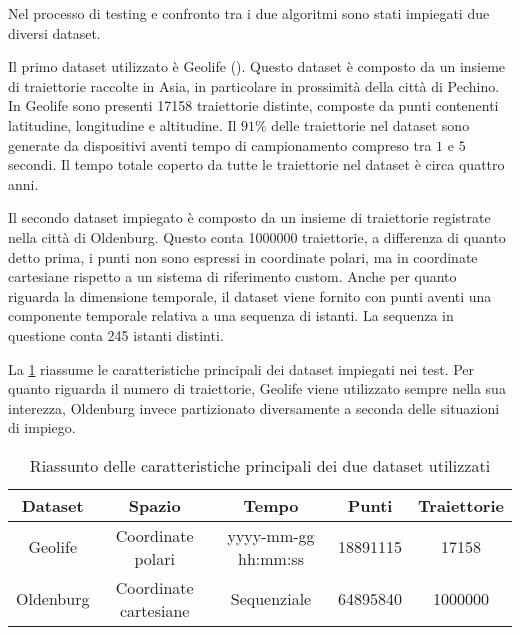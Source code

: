 Nel processo di testing e confronto tra i due algoritmi sono stati impiegati due diversi dataset.

Il primo dataset utilizzato è Geolife (\cite{GeolifeG31:online}).
Questo dataset è composto da un insieme di traiettorie raccolte in Asia, in particolare in prossimità della città di Pechino.
In Geolife sono presenti 17158 traiettorie distinte, composte da punti contenenti latitudine, longitudine e altitudine.
Il \(91\%\) delle traiettorie nel dataset sono generate da dispositivi aventi tempo di campionamento compreso tra \(1\) e \(5\) secondi.
Il tempo totale coperto da tutte le traiettorie nel dataset è circa quattro anni.

Il secondo dataset impiegato è composto da un insieme di traiettorie registrate nella città di Oldenburg.
Questo conta 1000000 traiettorie, a differenza di quanto detto prima, i punti non sono espressi in coordinate polari, ma in coordinate cartesiane rispetto a un sistema di riferimento custom.
Anche per quanto riguarda la dimensione temporale, il dataset viene fornito con punti aventi una componente temporale relativa a una sequenza di istanti.
La sequenza in questione conta 245 istanti distinti.

La \cref{tab:metrics-dataset} riassume le caratteristiche principali dei dataset impiegati nei test.
Per quanto riguarda il numero di traiettorie, Geolife viene utilizzato sempre nella sua interezza, Oldenburg invece partizionato diversamente a seconda delle situazioni di impiego.


\begin{table}[H]
    \centering
   \begin{tabular}{||c c c c c||}
 \hline
     Dataset & Spazio & Tempo & Punti & Traiettorie\\ [0.4ex] 
 \hline\hline
    Geolife & Coordinate polari & yyyy-mm-gg hh:mm:ss & 18891115 & 17158 \\ 
 \hline
     Oldenburg & Coordinate cartesiane & Sequenziale & 64895840 & 1000000 \\ 
 \hline
\end{tabular}
    \caption{Riassunto delle caratteristiche principali dei due dataset utilizzati}
    \label{tab:metrics-dataset}
\end{table}
